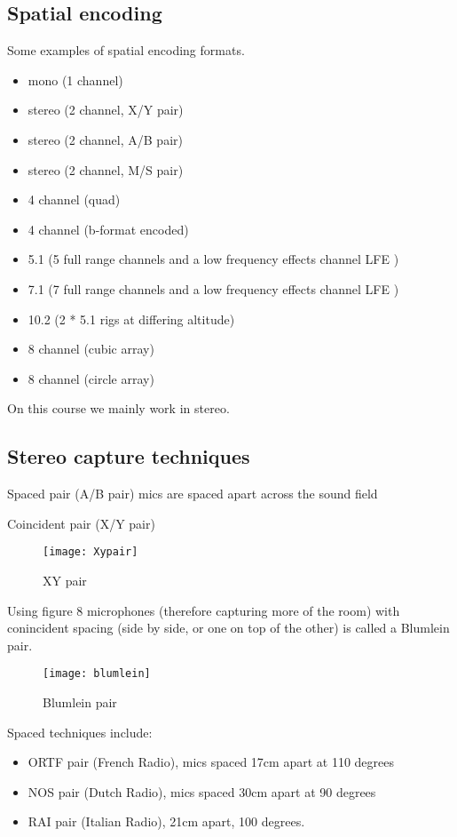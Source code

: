 \subsection{Spatial encoding}
Some examples of spatial encoding formats.
\begin{itemize}
\item mono (1 channel)
\item stereo (2 channel, X/Y pair)
\item stereo (2 channel, A/B pair)
\item stereo (2 channel, M/S pair)
\item 4 channel (quad)
\item 4 channel (b-format encoded)
\item 5.1 (5 full range channels and a low frequency effects channel LFE )
\item 7.1 (7 full range channels and a low frequency effects channel LFE )
\item 10.2 (2 * 5.1 rigs at differing altitude)
\item 8 channel (cubic array)
\item 8 channel (circle array)
\end{itemize}

On this course we mainly work in stereo.



\subsection{Stereo capture techniques}

Spaced pair (A/B pair) mics are spaced apart across the sound field

Coincident pair (X/Y pair)

\begin{figure}[H]
\centering
\texttt{[image: Xypair]}\caption{XY pair}
\label{fig:xypair}
\end{figure}

Using figure 8 microphones (therefore capturing more of the room) with conincident spacing (side by side, or one on top of the other) is called a Blumlein pair. 

\begin{figure}[H]
\centering
\texttt{[image: blumlein]}\caption{Blumlein pair}
\label{fig:blumleinpair}
\end{figure}

Spaced techniques include:
\begin{itemize}
\item ORTF pair (French Radio), mics spaced 17cm apart at 110 degrees
\item NOS pair (Dutch Radio), mics spaced 30cm apart at 90 degrees
\item RAI pair (Italian Radio), 21cm apart, 100 degrees. 
\end{itemize}

